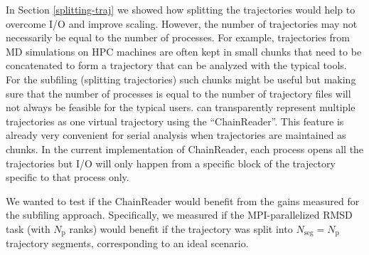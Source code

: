 \label{sec:chainreader}

In Section \ref{splitting-traj} we showed how splitting the trajectories would help to overcome I/O and improve scaling. 
However, the number of trajectories may not necessarily be equal to the number of processes.
For example, trajectories from MD simulations on HPC machines are often kept in small chunks that need to be concatenated to form a trajectory that can be analyzed with the typical tools.
For the subfiling (splitting trajectories) such chunks might be useful but making sure that the number of processes is equal to the number of trajectory files will not always be feasible for the typical users. 
 can transparently represent multiple trajectories as one virtual trajectory using the ``ChainReader''.
This feature is already very convenient for serial analysis when trajectories are maintained as chunks.
In the current implementation of ChainReader, each process opens all the trajectories but I/O will only happen from a specific block of the trajectory specific to that process only.

We wanted to test if the ChainReader would benefit from the gains measured for the subfiling approach.
Specifically, we measured if the MPI-parallelized RMSD task (with $N_{\text{p}}$ ranks) would benefit if the trajectory was split into $N_{\text{seg}} = N_{\text{p}}$ trajectory segments, corresponding to an ideal scenario.
 
